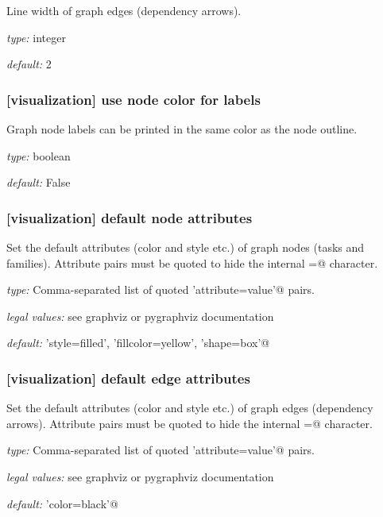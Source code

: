 Line width of graph edges (dependency arrows).

\begin{myitemize}
    \item {\em type:} integer
    \item {\em default:} 2
\end{myitemize}

\subsubsection[use node color for labels]{[visualization] \textrightarrow use node color for labels}

Graph node labels can be printed in the same color as the node outline.

\begin{myitemize}
    \item {\em type:} boolean
    \item {\em default:} False
\end{myitemize}


\subsubsection[default node attributes]{[visualization] \textrightarrow default node attributes}

Set the default attributes (color and style etc.) of graph nodes (tasks and families).
Attribute pairs must be quoted to hide the internal \lstinline@=@ character.

\begin{myitemize}
    \item {\em type:} Comma-separated list of quoted \lstinline@'attribute=value'@ pairs.
    \item {\em legal values:} see graphviz or pygraphviz documentation
    \item {\em default:} \lstinline@'style=filled', 'fillcolor=yellow', 'shape=box'@
\end{myitemize}

\subsubsection[default edge attributes]{[visualization] \textrightarrow default edge attributes}

Set the default attributes (color and style etc.) of graph edges
(dependency arrows).  Attribute pairs must be quoted to hide the
internal \lstinline@=@ character.
\begin{myitemize}
    \item {\em type:} Comma-separated list of quoted \lstinline@'attribute=value'@ pairs.
    \item {\em legal values:} see graphviz or pygraphviz documentation
    \item {\em default:} \lstinline@'color=black'@
\end{myitemize}


